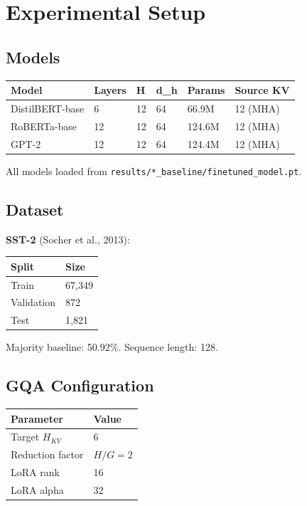 
\section{Experimental Setup}

\subsection{Models}

\begin{table}[H]
\centering
\small
\begin{tabular}{llllll}
\toprule
\textbf{Model} & \textbf{Layers} & \textbf{H} & \textbf{d\_h} & \textbf{Params} & \textbf{Source KV} \\
\midrule
DistilBERT-base & 6 & 12 & 64 & 66.9M & 12 (MHA) \\
RoBERTa-base & 12 & 12 & 64 & 124.6M & 12 (MHA) \\
GPT-2 & 12 & 12 & 64 & 124.4M & 12 (MHA) \\
\bottomrule
\end{tabular}
\end{table}

All models loaded from \texttt{results/*\_baseline/finetuned\_model.pt}.

\subsection{Dataset}

\textbf{SST-2} (Socher et al., 2013):

\begin{table}[H]
\centering
\small
\begin{tabular}{ll}
\toprule
\textbf{Split} & \textbf{Size} \\
\midrule
Train & 67,349 \\
Validation & 872 \\
Test & 1,821 \\
\bottomrule
\end{tabular}
\end{table}

Majority baseline: 50.92\%. Sequence length: 128.

\subsection{GQA Configuration}

\begin{table}[H]
\centering
\small
\begin{tabular}{ll}
\toprule
\textbf{Parameter} & \textbf{Value} \\
\midrule
Target $H_{KV}$ & 6 \\
Reduction factor & $H / G = 2$ \\
LoRA rank & 16 \\
LoRA alpha & 32 \\
\bottomrule
\end{tabular}
\end{table}

